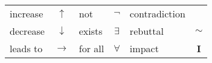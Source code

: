 \documentclass[a4paper,12pt]{scrartcl}
\begin{document}
\begin{table*}[h!]
	\centering
	\begin{tabular}{l  c | l c | l c}
		increase & $\uparrow$ & not & $\neg$ & contradiction & \Lightning \\
		decrease & $\downarrow$ & exists & $\exists$ & rebuttal & $\sim$ \\
		leads to & $\rightarrow$ & for all & $\forall$ & impact & \textbf{I}
	\end{tabular}
\end{table*}		
	
\end{document}
